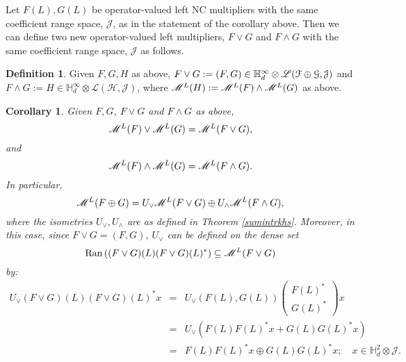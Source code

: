 \documentclass[11pt]{article}
\newcommand{\ba}{\begin{eqnarray}}
\newcommand{\ea}{\end{eqnarray}}
\newcommand{\bpm}{\begin{pmatrix}}
\newcommand{\epm}{\end{pmatrix}}
\newcommand{\nn}{\nonumber}
\newcommand{\scr}{\ensuremath{\mathscr}}
\newcommand{\mc}{\ensuremath{\mathcal}}
\def\bH{\mathbb{H}}
\renewcommand{\H}{\ensuremath{\mathcal{H} }}
\newcommand{\J}{\ensuremath{\mathcal{J} }}
\renewcommand{\L}{\ensuremath{\mathscr{L} }}
\newcommand{\ran}[1]{\ensuremath{\mathrm{Ran} \left( {#1} \right) }}
\numberwithin{equation}{section}
\numberwithin{subsection}{section}
\newtheorem{cor}[subsection]{Corollary}
\theoremstyle{definition}
\newtheorem{defn}[subsection]{Definition}
\begin{document}
Let $F(L), G(L)$ be operator-valued left NC multipliers with the same coefficient range space, $\J$, as in the statement of the corollary above. Then we can define two new operator-valued left multipliers, $F \vee G$ and $F \wedge G$ with the same coefficient range space, $\J$ as follows.

\begin{defn}
Given $F, G, H$ as above, $F \vee G := (F , G) \in \bH ^\infty _d \otimes \L (\mc{F} \oplus \mc{G}, \J )$ and $F \wedge G := H \in \bH ^\infty _d \otimes \L ( \H, \J )$, where $\scr{M} ^L (H) := \scr{M} ^L (F) \wedge \scr{M} ^L (G)$ as above. 
\end{defn}


\begin{cor} \label{domuvee}
Given $F, G$, $F \vee G$ and $F \wedge G$ as above,
$$\scr{M} ^L (F) \vee \scr{M} ^L (G) = \scr{M} ^L (F \vee G), $$ and 
$$ \scr{M} ^L (F) \wedge \scr{M} ^L (G) = \scr{M} ^L (F \wedge G). $$ In particular,
$$ \scr{M} ^L (F \oplus G) = U _\vee \scr{M} ^L (F \vee G) \oplus U_\wedge \scr{M} ^L (F \wedge G), $$ where the isometries $U_\vee, U _\wedge$ are as defined in Theorem \ref{sumintrkhs}. Moreover, in this case, since $F \vee G = (F, G)$, $U_\vee$ can be defined on the dense set $$ \ran{(F\vee G) (L) (F\vee G) (L) ^* } \subseteq \scr{M} ^L (F \vee G)$$ by:
\ba U_\vee (F \vee G) (L) (F \vee G) (L) ^* x & = & U_\vee \left( F(L) , G(L) \right) \bpm F(L) ^* \\ G(L) ^* \epm x \nn \\
& = & U_\vee (F(L) F(L) ^* x + G(L) G(L) ^* x ) \nn \\
& = & F(L) F(L) ^* x \oplus G(L) G(L) ^* x; \quad x \in \bH ^2 _d \otimes \J.  \nn \ea 
\end{cor}
\end{document}
